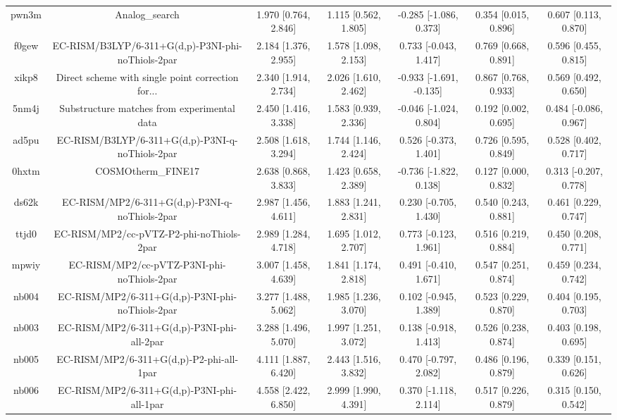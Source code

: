 \documentclass{article}
\begin{document}
\begin{center}
\begin{longtable}{|ccccccc|}
 pwn3m &                                     Analog\_search &  1.970 [0.764, 2.846] &  1.115 [0.562, 1.805] &   -0.285 [-1.086, 0.373] &  0.354 [0.015, 0.896] &   0.607 [0.113, 0.870] \\
 f0gew &  EC-RISM/B3LYP/6-311+G(d,p)-P3NI-phi-noThiols-2par &  2.184 [1.376, 2.955] &  1.578 [1.098, 2.153] &    0.733 [-0.043, 1.417] &  0.769 [0.668, 0.891] &   0.596 [0.455, 0.815] \\
 xikp8 &  Direct scheme with single point correction for... &  2.340 [1.914, 2.734] &  2.026 [1.610, 2.462] &  -0.933 [-1.691, -0.135] &  0.867 [0.768, 0.933] &   0.569 [0.492, 0.650] \\
 5nm4j &        Substructure matches from experimental data &  2.450 [1.416, 3.338] &  1.583 [0.939, 2.336] &   -0.046 [-1.024, 0.804] &  0.192 [0.002, 0.695] &  0.484 [-0.086, 0.967] \\
 ad5pu &    EC-RISM/B3LYP/6-311+G(d,p)-P3NI-q-noThiols-2par &  2.508 [1.618, 3.294] &  1.744 [1.146, 2.424] &    0.526 [-0.373, 1.401] &  0.726 [0.595, 0.849] &   0.528 [0.402, 0.717] \\
 0hxtm &                                 COSMOtherm\_FINE17 &  2.638 [0.868, 3.833] &  1.423 [0.658, 2.389] &   -0.736 [-1.822, 0.138] &  0.127 [0.000, 0.832] &  0.313 [-0.207, 0.778] \\
 ds62k &      EC-RISM/MP2/6-311+G(d,p)-P3NI-q-noThiols-2par &  2.987 [1.456, 4.611] &  1.883 [1.241, 2.831] &    0.230 [-0.705, 1.430] &  0.540 [0.243, 0.881] &   0.461 [0.229, 0.747] \\
 ttjd0 &           EC-RISM/MP2/cc-pVTZ-P2-phi-noThiols-2par &  2.989 [1.284, 4.718] &  1.695 [1.012, 2.707] &    0.773 [-0.123, 1.961] &  0.516 [0.219, 0.884] &   0.450 [0.208, 0.771] \\
 mpwiy &         EC-RISM/MP2/cc-pVTZ-P3NI-phi-noThiols-2par &  3.007 [1.458, 4.639] &  1.841 [1.174, 2.818] &    0.491 [-0.410, 1.671] &  0.547 [0.251, 0.874] &   0.459 [0.234, 0.742] \\
 nb004 &    EC-RISM/MP2/6-311+G(d,p)-P3NI-phi-noThiols-2par &  3.277 [1.488, 5.062] &  1.985 [1.236, 3.070] &    0.102 [-0.945, 1.389] &  0.523 [0.229, 0.870] &   0.404 [0.195, 0.703] \\
 nb003 &         EC-RISM/MP2/6-311+G(d,p)-P3NI-phi-all-2par &  3.288 [1.496, 5.070] &  1.997 [1.251, 3.072] &    0.138 [-0.918, 1.413] &  0.526 [0.238, 0.874] &   0.403 [0.198, 0.695] \\
 nb005 &           EC-RISM/MP2/6-311+G(d,p)-P2-phi-all-1par &  4.111 [1.887, 6.420] &  2.443 [1.516, 3.832] &    0.470 [-0.797, 2.082] &  0.486 [0.196, 0.879] &   0.339 [0.151, 0.626] \\
 nb006 &         EC-RISM/MP2/6-311+G(d,p)-P3NI-phi-all-1par &  4.558 [2.422, 6.850] &  2.999 [1.990, 4.391] &    0.370 [-1.118, 2.114] &  0.517 [0.226, 0.879] &   0.315 [0.150, 0.542] \\
\end{longtable}
\end{center}
\end{document}
